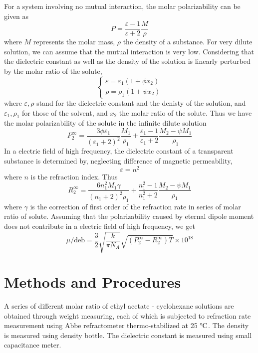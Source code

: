\documentclass[%
 reprint,
 amsmath,amssymb,
 aps,
10.5pt,
]{revtex4-1}
\newcommand{\celsius}{\ensuremath{^\circ\hspace{-0.09em}\mathrm{C}}}
\begin{document}
For a system involving no mutual interaction, the molar polarizability can be given as
\begin{equation}
 P =  \frac{\varepsilon - 1}{\varepsilon+2}\frac{M}{\rho}
\end{equation}
where $M$ represents the molar mass, $\rho$ the density of a substance. For very dilute solution, we can assume that the mutual interaction is very low. Considering that the dielectric constant as well as the density of the solution is linearly perturbed by the molar ratio of the solute, 
\begin{equation}
  \begin{cases}
  \varepsilon=\varepsilon_1 ( 1+ \phi x_2)\\
  \rho = \rho_1 ( 1 + \psi x_2)
  \end{cases}
\end{equation}
where $\varepsilon,\rho$ stand for the dielectric constant and the denisty of the solution, and $\varepsilon_1, \rho_1$ for those of the solvent, and $x_2$ the molar ratio of the solute. Thus we have the molar polarizability of the solute in the infinite dilute solution
\begin{equation}
  P_2^\infty = \frac{3\phi\varepsilon_1}{(\varepsilon_1+2)^2}\frac{M_1}{\rho_1} + \frac{\varepsilon_1-1}{\varepsilon_1+2}\frac{M_2 - \psi M_1}{\rho_1}
\end{equation}
In a electric field of high frequency, the dielectric constant of a transparent substance is determined by, neglecting difference of magnetic permeability,
\begin{equation}
  \varepsilon = n^2
\end{equation}
where $n$ is the refraction index. Thus
\begin{equation}
  R_2^\infty = \frac{6 n_1^2 M_1 \gamma}{(n_1 +2)^2 \rho_1} + \frac{n_1^2-1}{n_1^2+2} \frac{M_2 - \psi M_1}{\rho_1}
  \end{equation}
  where $\gamma$ is the correction of first order of the refraction rate in series of molar ratio of solute. 
  Assuming that the polarizability caused by eternal dipole moment does not contribute in a electric field of high frequency, we get
  \begin{equation}
    \mu/\mathrm{deb} = \frac{3}{2} \sqrt{\frac{k}{\pi N_A}} \sqrt{(P_2^\infty - R_2 ^ \infty )T} \times 10^{18}
  \end{equation}

  \section{Methods and Procedures}
  A series of different molar ratio of ethyl acetate - cyclohexane solutions are obtained through weight measuring, each of which is subjected to refraction rate measurement using Abbe refractometer thermo-stabilized at 25 \celsius. The density is measured using density bottle. The dielectric constant is measured using small capacitance meter.
\end{document}
